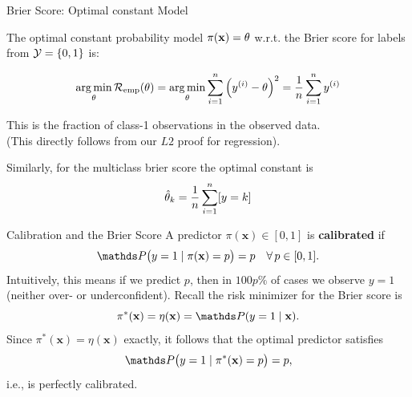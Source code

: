\documentclass[11pt,compress,t,notes=noshow, xcolor=table]{beamer}
\begin{document}
\begin{vbframe}{Brier Score: Optimal constant Model}

The optimal constant probability model $\pi(\mathbf{x}) = \theta$ w.r.t. the Brier score for labels from $\mathcal{Y} = \{0, 1\}$ is:

\vspace*{-0.2cm}

\begin{equation*}
  \mathop{\mathrm{arg\,min}}_{\theta} \mathcal{R}_{\text{emp}}(\theta) = \mathop{\mathrm{arg\,min}}_{\theta} \sum\limits_{i=1}^n \left(y^{(i)} - \theta\right)^2 = \frac{1}{n} \sum\limits_{i=1}^n y^{(i)}
\end{equation*}

This is the fraction of class-1 observations in the observed data.\\
(This directly follows from our $L2$ proof for regression).

\vspace*{0.2cm}

Similarly, for the multiclass brier score the optimal constant is $$\hat{\theta}_k = \frac{1}{n}\sum\limits_{i=1}^n [y = k]$$ 

\end{vbframe}

\begin{vbframe}{Calibration and the Brier Score}
A predictor \(\pi(\mathbf{x})\in[0,1]\) is \textbf{calibrated} if 
\[
\P\bigl(y=1 \mid \pi(\mathbf{x})=p\bigr)=p \quad \forall\, p\in[0,1].
\]
Intuitively, this means if we predict $p$, then in $100p\%$ of cases we observe $y=1$ (neither over- or underconfident). Recall the risk minimizer for the Brier score is
\[
\pi^*(\mathbf{x}) = \eta(\mathbf{x}) = \P(y=1 \mid \mathbf{x}).
\]
Since \(\pi^*(\mathbf{x})=\eta(\mathbf{x})\) exactly, it follows that the optimal predictor satisfies
\[
\P\bigl(y=1 \mid \pi^*(\mathbf{x})=p\bigr)=p,
\]
i.e., is perfectly calibrated.
\end{vbframe}
\end{document}
